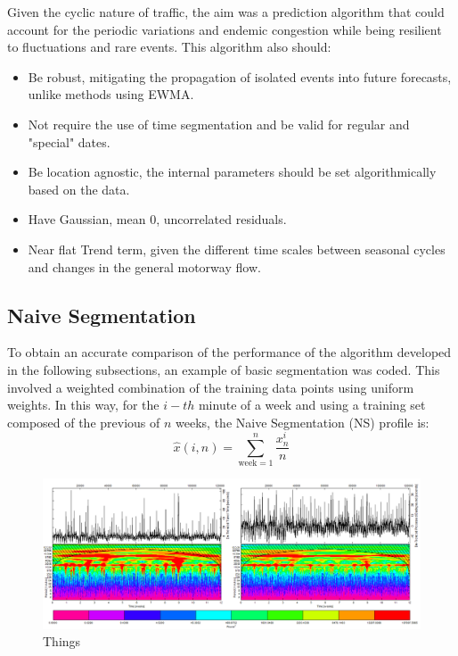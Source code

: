 \documentclass[letterpaper, 10 pt, conference]{ieeeconf}  %
\begin{document}

Given the cyclic nature of traffic, the aim was a prediction algorithm that could account for the periodic variations and endemic congestion while being resilient to fluctuations and rare events. This algorithm also should:
\begin{itemize}
	\item Be robust, mitigating the propagation of isolated events into future forecasts, unlike methods using EWMA.
	\item Not require the use of time segmentation and be valid for regular and "special" dates.
	\item Be location agnostic, the internal parameters should be set algorithmically based on the data.
	\item Have Gaussian, mean 0, uncorrelated residuals.
	\item Near flat Trend term, given the different time scales between seasonal cycles and changes in the general motorway flow.
\end{itemize}

\subsection{Naive Segmentation}
To obtain an accurate comparison of the performance of the algorithm developed in the following subsections, an example of basic segmentation was coded. 
This involved a weighted combination of the training data points using uniform weights. 
In this way, for the $i-th$ minute of a week and using a training set composed of the previous of $n$ weeks, the Naive Segmentation (NS) profile is:
\begin{equation}
\hat{x}(i,n) = \sum_{\textrm{week}=1}^{n} \frac{x^i_n}{n} 
\end{equation}

\begin{figure}[htbp]
	\centerline{\includegraphics[width=\linewidth]{./images/WT_combined_1500_600.png}}
	\caption{Things}
	\label{fig:wt}
\end{figure}
\end{document}
